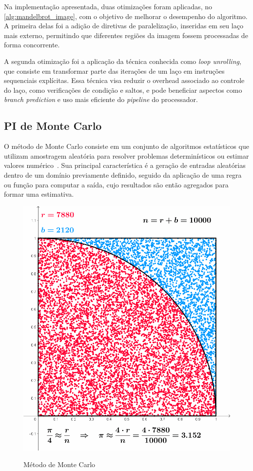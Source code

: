 Na implementação apresentada, duas otimizações foram aplicadas, no \autoref{alg:mandelbrot_image}, com o objetivo de melhorar o desempenho do algoritmo. A primeira delas foi a adição de diretivas de paralelização, inseridas em seu laço mais externo, permitindo que diferentes regiões da imagem fossem processadas de forma concorrente.

A segunda otimização foi a aplicação da técnica conhecida como \textit{loop unrolling}, que consiste em transformar parte das iterações de um laço em instruções sequenciais explícitas. Essa técnica visa reduzir o overhead associado ao controle do laço, como verificações de condição e saltos, e pode beneficiar aspectos como \textit{branch prediction} e uso mais eficiente do \textit{pipeline} do processador.

\subsection{PI de Monte Carlo}\label{subsec:pi}

O método de Monte Carlo consiste em um conjunto de algoritmos estatísticos que utilizam amostragem aleatória para resolver problemas determinísticos ou estimar valores numérico~\cite{morettin2010}. Sua principal característica é a geração de entradas aleatórias dentro de um domínio previamente definido, seguido da aplicação de uma regra ou função para computar a saída, cujo resultados são então agregados para formar uma estimativa.

\begin{figure}[htb]
	\caption{Método de Monte Carlo}
	\centering
	\includegraphics[scale=0.5]{figuras/pi.png}
	\label{fig:pi}
\end{figure}

